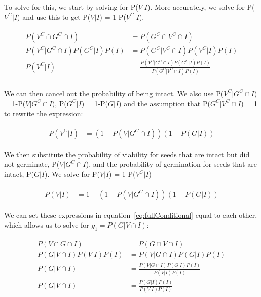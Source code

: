\documentclass[12pt, oneside]{article}   	%
\begin{document}
To solve for this, we start by solving for P($V|I$). More accurately, we solve for P($V^C|I$) and use this to get P($V|I$) = 1-P($V^C|I$).

  \begin{align}
\begin{split}
	P(V^C \cap G^C \cap I) &= P(G^C \cap V^C \cap I) \\
	P(V^C | G^C \cap I) P(G^C | I) P(I) &= P(G^C | V^C \cap I) P(V^C | I) P(I) 	\\
	P(V^C | I) &= \frac{ P(V^C | G^C \cap I) P(G^C | I) P(I) }{P(G^C | V^C \cap I) P(I)}\\
  \end{split}
\end{align}

We can then cancel out the probability of being intact. We also use P($V^C | G^C \cap I$) = 1-P($V | G^C \cap I$), P($G^C | I$) = 1-P($G | I$) and the assumption that P($G^C|V^C \cap I$) = 1 to rewrite the expression:

  \begin{align}
\begin{split}
	P(V^C | I) &=  ( 1-P(V | G^C \cap I) ) (1 - P(G | I)  )
  \end{split}
\end{align}

We then substitute the probability of viability for seeds that are intact but did not germinate, P($V | G^C \cap I$), and the probability of germination for seeds that are intact, P($G|I$). We solve for P($V | I$) = 1-P($V^C | I$) 

  \begin{align}
\begin{split}
	P(V | I) &= 1-  ( 1-P(V | G^C \cap I) ) (1 - P(G | I)  )
  \end{split}
\end{align}

We can set these expressions in equation~\eqref{eq:fullConditional} equal to each other, which allows us to solve for  $g_1 = P(G | V \cap I)$:

  \begin{align}
\begin{split}
	P(V \cap G \cap I) &= P(G \cap V \cap I) \\
	P(G | V \cap I) P(V | I) P(I) &= P(V | G \cap I) P(G | I) P(I) \\
	P(G | V \cap I)  &= \frac{P(V | G \cap I) P(G | I)  P(I)}{P(V | I)  P(I) } \\
	P(G | V \cap I)  &= \frac{ P(G | I)  P(I)}{P(V | I)  P(I) }
  \end{split}
\end{align}
  
\end{document}
